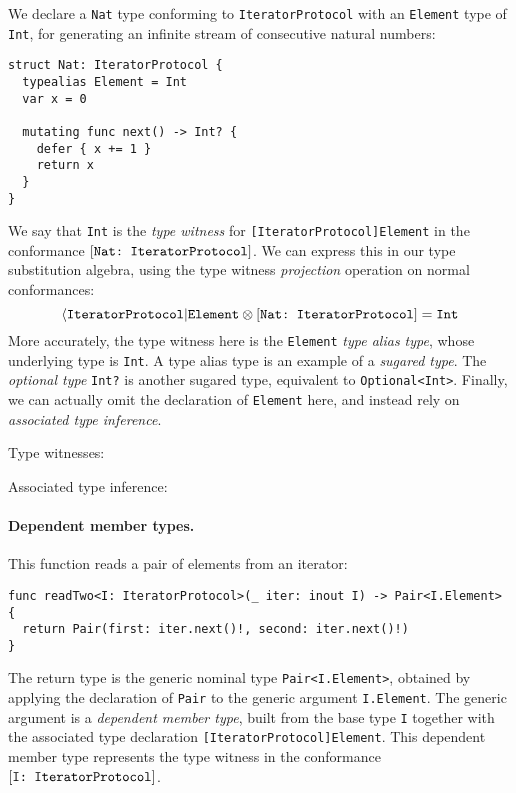\documentclass[../generics]{subfiles}
\begin{document}
We declare a \texttt{Nat} type conforming to \texttt{IteratorProtocol} with an \texttt{Element} type of \texttt{Int}, for generating an infinite stream of consecutive natural numbers:
\begin{Verbatim}
struct Nat: IteratorProtocol {
  typealias Element = Int
  var x = 0
  
  mutating func next() -> Int? {
    defer { x += 1 }
    return x
  }
}
\end{Verbatim}
We say that \texttt{Int} is the \emph{type witness} for \texttt{[IteratorProtocol]Element} in the conformance $[\texttt{Nat:~IteratorProtocol}]$. We can express this in our type substitution algebra, using the type witness \emph{projection} operation on normal conformances:
\[\langle\texttt{IteratorProtocol}|\texttt{Element}\otimes [\texttt{Nat:~IteratorProtocol}] = \texttt{Int}\]
More accurately, the type witness here is the \texttt{Element} \emph{type alias type}, whose underlying type is \texttt{Int}. A type alias type is an example of a \emph{sugared type}. The \emph{optional type} \texttt{Int?} is another sugared type, equivalent to \texttt{Optional<Int>}. Finally, we can actually omit the declaration of \texttt{Element} here, and instead rely on \emph{associated type inference}.

\begin{MoreDetails}
\item Type witnesses: 
\item Associated type inference: 
\end{MoreDetails}

\paragraph{Dependent member types.} This function reads a pair of elements from an iterator:
\begin{Verbatim}
func readTwo<I: IteratorProtocol>(_ iter: inout I) -> Pair<I.Element> {
  return Pair(first: iter.next()!, second: iter.next()!)
}
\end{Verbatim}
The return type is the generic nominal type \texttt{Pair<I.Element>}, obtained by applying the declaration of \texttt{Pair} to the generic argument \texttt{I.Element}. The generic argument is a \emph{dependent member type}, built from the base type \texttt{I} together with the associated type declaration \texttt{[IteratorProtocol]Element}. This dependent member type represents the type witness in the conformance $[\texttt{I:~IteratorProtocol}]$.
\end{document}
